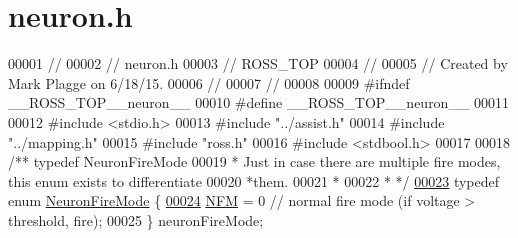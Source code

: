 \hypertarget{neuron_8h_source}{}\section{neuron.\+h}
\label{neuron_8h_source}

\begin{DoxyCode}
00001 \textcolor{comment}{//}
00002 \textcolor{comment}{//  neuron.h}
00003 \textcolor{comment}{//  ROSS\_TOP}
00004 \textcolor{comment}{//}
00005 \textcolor{comment}{//  Created by Mark Plagge on 6/18/15.}
00006 \textcolor{comment}{//}
00007 \textcolor{comment}{//}
00008 
00009 \textcolor{preprocessor}{#}\textcolor{preprocessor}{ifndef} \textcolor{preprocessor}{\_\_ROSS\_TOP\_\_neuron\_\_}
00010 \textcolor{preprocessor}{#}\textcolor{preprocessor}{define} \textcolor{preprocessor}{\_\_ROSS\_TOP\_\_neuron\_\_}
00011 
00012 \textcolor{preprocessor}{#}\textcolor{preprocessor}{include} \textcolor{preprocessor}{<}\textcolor{preprocessor}{stdio}\textcolor{preprocessor}{.}\textcolor{preprocessor}{h}\textcolor{preprocessor}{>}
00013 \textcolor{preprocessor}{#}\textcolor{preprocessor}{include} \textcolor{preprocessor}{"../assist.h"}
00014 \textcolor{preprocessor}{#}\textcolor{preprocessor}{include} \textcolor{preprocessor}{"../mapping.h"}
00015 \textcolor{preprocessor}{#}\textcolor{preprocessor}{include} \textcolor{preprocessor}{"ross.h"}
00016 \textcolor{preprocessor}{#}\textcolor{preprocessor}{include} \textcolor{preprocessor}{<}\textcolor{preprocessor}{stdbool}\textcolor{preprocessor}{.}\textcolor{preprocessor}{h}\textcolor{preprocessor}{>}
00017 
00018 \textcolor{comment}{/** typedef NeuronFireMode}
00019 \textcolor{comment}{ * Just in case there are multiple fire modes, this enum exists to differentiate}
00020 \textcolor{comment}{ *them.}
00021 \textcolor{comment}{ *}
00022 \textcolor{comment}{ * */}
\hypertarget{neuron_8h_source_l00023}{}\hyperlink{neuron_8h_a48885ea6be5b55a2e24de9f97552d4ee}{00023}     \textcolor{keyword}{typedef} \textcolor{keyword}{enum} \hyperlink{neuron_8h_a48885ea6be5b55a2e24de9f97552d4ee}{NeuronFireMode} \{
\hypertarget{neuron_8h_source_l00024}{}\hyperlink{neuron_8h_a48885ea6be5b55a2e24de9f97552d4eea520c6b216334b8c2d914cf9fab8cd460}{00024}   \hyperlink{neuron_8h_a48885ea6be5b55a2e24de9f97552d4eea520c6b216334b8c2d914cf9fab8cd460}{NFM} = 0  \textcolor{comment}{// normal fire mode (if voltage > threshold, fire);}
00025     \} neuronFireMode;

\end{DoxyCode}
